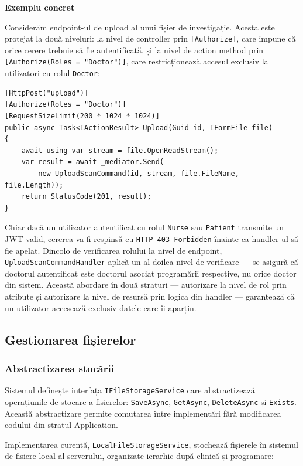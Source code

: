 \documentclass[12pt, a4paper]{report}
\begin{document}
\textbf{Exemplu concret}

Considerăm endpoint-ul de upload al unui fișier de investigație. Acesta este
protejat la două niveluri: la nivel de controller prin \texttt{[Authorize]}, care
impune că orice cerere trebuie să fie autentificată, și la nivel de action method
prin \texttt{[Authorize(Roles = "Doctor")]}, care restricționează accesul exclusiv
la utilizatori cu rolul \texttt{Doctor}:

\begin{verbatim}
[HttpPost("upload")]
[Authorize(Roles = "Doctor")]
[RequestSizeLimit(200 * 1024 * 1024)]
public async Task<IActionResult> Upload(Guid id, IFormFile file)
{
    await using var stream = file.OpenReadStream();
    var result = await _mediator.Send(
        new UploadScanCommand(id, stream, file.FileName, file.Length));
    return StatusCode(201, result);
}
\end{verbatim}

Chiar dacă un utilizator autentificat cu rolul \texttt{Nurse} sau \texttt{Patient}
transmite un JWT valid, cererea va fi respinsă cu \texttt{HTTP 403 Forbidden} înainte
ca handler-ul să fie apelat. Dincolo de verificarea rolului la nivel de endpoint,
\texttt{UploadScanCommandHandler} aplică un al doilea nivel de verificare --- se
asigură că doctorul autentificat este doctorul asociat programării respective, nu
orice doctor din sistem. Această abordare în două straturi --- autorizare la nivel
de rol prin atribute și autorizare la nivel de resursă prin logica din handler ---
garantează că un utilizator accesează exclusiv datele care îi aparțin.
    
\subsection{Gestionarea fișierelor}

\subsubsection{Abstractizarea stocării}

Sistemul definește interfața \texttt{IFileStorageService} care abstractizează
operațiunile de stocare a fișierelor: \texttt{SaveAsync}, \texttt{GetAsync},
\texttt{DeleteAsync} și \texttt{Exists}. Această abstractizare permite comutarea
între implementări fără modificarea codului din stratul Application.

Implementarea curentă, \texttt{LocalFileStorageService}, stochează fișierele în
sistemul de fișiere local al serverului, organizate ierarhic după clinică și
programare:
\end{document}
